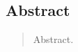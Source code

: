 \newenvironment{itquote}
  {\begin{quote}\itshape}
  {\end{quote}\ignorespacesafterend}
\newenvironment{itpars}
  {\par\itshape}
  {\par}


\begin{center}
\section*{Abstract}
\end{center}

\begin{quote}

Abstract.
\end{quote}
